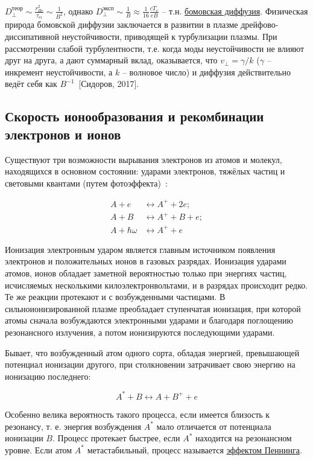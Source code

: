 \documentclass[10pt, a4paper]{article}
\newcommand{\Sidorov}{~[Сидоров, 2017]}
\begin{document}
$D_\perp^{\text{теор}}\sim\frac{r_{Be}^2}{\tau_{ei}}\sim\frac{1}{B^2}$, однако $D_\perp^{\text{эксп}}\sim\frac{1}{B}\approx\frac{1}{16}\frac{cT_e}{eB}$ -- т.н. \uline{бомовская диффузия}. Физическая природа бомовской диффузии заключается в развитии в плазме дрейфово-диссипативной неустойчивости, приводящей к турбулизации плазмы. При рассмотрении слабой турбулентности, т.е. когда моды неустойчивости не влияют друг на друга, а дают суммарный вклад, оказывается, что $v_\perp=\gamma/k$ ($\gamma$ -- инкремент неустойчивости, а $k$ -- волновое число) и диффузия действительно ведёт себя как $B^{-1}$\Sidorov.

\subsection{Скорость ионообразования и рекомбинации электронов и ионов}

Существуют три возможности вырывания электронов из атомов и молекул, находящихся в основном состоянии: ударами электронов, тяжёлых частиц и световыми квантами (путем фотоэффекта)~\cite{raizer}:

\begin{align*}
	A+e &\leftrightarrow A^{+}+2e;\\
	A+B &\leftrightarrow A^{+}+B+e;\\
	A+\hbar\omega &\leftrightarrow A^{+}+e
\end{align*}

Ионизация электронным ударом является главным источником появления электронов и положительных ионов в газовых разрядах. Ионизация ударами атомов, ионов обладает заметной вероятностью только при энергиях частиц, исчисляемых несколькими килоэлектронвольтами, и в разрядах происходит редко. Те же реакции протекают и с возбужденными частицами. В сильноионизированной плазме преобладает ступенчатая ионизация, при которой атомы сначала возбуждаются электронными ударами и благодаря поглощению резонансного излучения, а потом ионизируются последующими ударами.

Бывает, что возбужденный атом одного сорта, обладая энергией, превышающей потенциал ионизации другого, при столкновении затрачивает свою энергию на ионизацию последнего:

\begin{equation*}
	A^{*}+B\leftrightarrow A+ B^{+}+e
\end{equation*}

Особенно велика вероятность такого процесса, если имеется близость к резонансу, т. е. энергия возбуждения $A^{*}$ мало отличается от потенциала ионизации $B$. Процесс протекает быстрее, если $A^{*}$ находится на резонансном уровне. Если атом $A^{*}$ метастабильный, процесс называется \uline{эффектом Пеннинга}.
\end{document}
